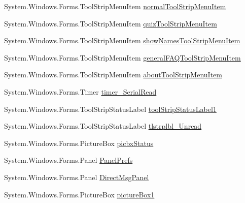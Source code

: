 \begin{DoxyCompactItemize}
\item 
\-System.\-Windows.\-Forms.\-Tool\-Strip\-Menu\-Item \hyperlink{class_sr_p___classroom_inq_1_1frm_classrrom_inq_a19933124599a8ff87bd0d7fd10808c4e}{normal\-Tool\-Strip\-Menu\-Item}
\item 
\-System.\-Windows.\-Forms.\-Tool\-Strip\-Menu\-Item \hyperlink{class_sr_p___classroom_inq_1_1frm_classrrom_inq_a01bd4f13b978688a925fcace4c5f92bc}{quiz\-Tool\-Strip\-Menu\-Item}
\item 
\-System.\-Windows.\-Forms.\-Tool\-Strip\-Menu\-Item \hyperlink{class_sr_p___classroom_inq_1_1frm_classrrom_inq_a128944d3506ac87f9278cc8917a9e6f0}{show\-Names\-Tool\-Strip\-Menu\-Item}
\item 
\-System.\-Windows.\-Forms.\-Tool\-Strip\-Menu\-Item \hyperlink{class_sr_p___classroom_inq_1_1frm_classrrom_inq_a457cf8afff4e2fd2d76ffa56065350ad}{general\-F\-A\-Q\-Tool\-Strip\-Menu\-Item}
\item 
\-System.\-Windows.\-Forms.\-Tool\-Strip\-Menu\-Item \hyperlink{class_sr_p___classroom_inq_1_1frm_classrrom_inq_a91d70ebcd0a0ce1237f845c90919cc8b}{about\-Tool\-Strip\-Menu\-Item}
\item 
\-System.\-Windows.\-Forms.\-Timer \hyperlink{class_sr_p___classroom_inq_1_1frm_classrrom_inq_ae222e5fb7d4ed8ef65c9c3ff836cecf6}{timer\-\_\-\-Serial\-Read}
\item 
\-System.\-Windows.\-Forms.\-Tool\-Strip\-Status\-Label \hyperlink{class_sr_p___classroom_inq_1_1frm_classrrom_inq_ad0f9f7002296a43527da34b1f476ce4e}{tool\-Strip\-Status\-Label1}
\item 
\-System.\-Windows.\-Forms.\-Tool\-Strip\-Status\-Label \hyperlink{class_sr_p___classroom_inq_1_1frm_classrrom_inq_afe9bef57098dfe8005fc34664f678826}{tlstrplbl\-\_\-\-Unread}
\item 
\-System.\-Windows.\-Forms.\-Picture\-Box \hyperlink{class_sr_p___classroom_inq_1_1frm_classrrom_inq_a5252272b4880f9a8d5ecf8fcd1828873}{picbx\-Status}
\item 
\-System.\-Windows.\-Forms.\-Panel \hyperlink{class_sr_p___classroom_inq_1_1frm_classrrom_inq_aac0efdb76f2989a17842359cc1a15ec9}{\-Panel\-Prefs}
\item 
\-System.\-Windows.\-Forms.\-Panel \hyperlink{class_sr_p___classroom_inq_1_1frm_classrrom_inq_a3241f0f690675052aff4224bc4fabc3d}{\-Direct\-Msg\-Panel}
\item 
\-System.\-Windows.\-Forms.\-Picture\-Box \hyperlink{class_sr_p___classroom_inq_1_1frm_classrrom_inq_ab971146df86e1277868bef4199a7b8f4}{picture\-Box1}
\item 

\end{DoxyCompactItemize}
